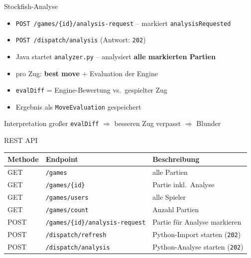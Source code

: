\documentclass[10pt, aspectratio=169]{beamer}
\begin{document}
\begin{frame}{Stockfish-Analyse}
  \begin{itemize}
    \item \texttt{POST /games/\{id\}/analysis-request} -- markiert
          \texttt{analysisRequested}
    \item \texttt{POST /dispatch/analysis} (Antwort: \texttt{202})
    \item Java startet \texttt{analyzer.py} -- analysiert \textbf{alle markierten Partien}
    \item pro Zug: \textbf{best move} + Evaluation der Engine
    \item \texttt{evalDiff} = Engine-Bewertung vs.\ gespielter Zug
    \item Ergebnis als \texttt{MoveEvaluation} gespeichert
  \end{itemize}
  \begin{block}{Interpretation}
    großer \texttt{evalDiff} $\Rightarrow$ besseren Zug verpasst $\Rightarrow$ Blunder
  \end{block}
\end{frame}

\begin{frame}{REST API}
  \begin{center}
  \begin{tabular}{lll}
    \toprule
    \textbf{Methode} & \textbf{Endpoint} & \textbf{Beschreibung} \\
    \midrule
    GET & \texttt{/games} & alle Partien \\
    GET & \texttt{/games/\{id\}} & Partie inkl.\ Analyse \\
    GET & \texttt{/games/users} & alle Spieler \\
    GET & \texttt{/games/count} & Anzahl Partien \\
    POST & \texttt{/games/\{id\}/analysis-request} & Partie für Analyse markieren \\
    POST & \texttt{/dispatch/refresh} & Python-Import starten (\texttt{202}) \\
    POST & \texttt{/dispatch/analysis} & Python-Analyse starten (\texttt{202}) \\
    \bottomrule
  \end{tabular}
  \end{center}
\end{frame}
\end{document}
